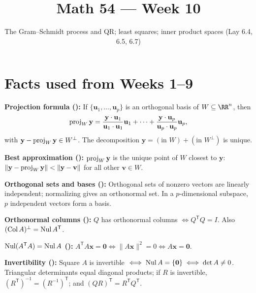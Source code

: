 \documentclass[10pt]{scrartcl}
\title{Math 54 --- Week 10}
\subtitle{The Gram--Schmidt process and QR; least squares; inner product spaces (Lay 6.4, 6.5, 6.7)}
\author{}\date{}\ihead{}
\newcommand{\vv}[1]{\mathbf{#1}}
\begin{document}
\maketitle

\section{Facts used from Weeks 1--9}

\begin{enumerate}[label=(W\arabic*),leftmargin=2.8em,itemsep=4pt]
  \ii {}\textbf{Projection formula ():} If $\{\vv u_1,\dots,\vv u_p\}$ is an orthogonal basis of $W\subseteq\RR^n$, then
  \[
    \proj_W\vv y = \frac{\vv y\cdot\vv u_1}{\vv u_1\cdot\vv u_1}\vv u_1 + \dots + \frac{\vv y\cdot\vv u_p}{\vv u_p\cdot\vv u_p}\vv u_p,
  \]
  with $\vv y-\proj_W\vv y\in W^\perp$. The decomposition $\vv y=(\text{in }W)+(\text{in }W^\perp)$ is unique.

  \ii {}\textbf{Best approximation ():} $\proj_W\vv y$ is the unique point of $W$ closest to $\vv y$: $\|\vv y-\proj_W\vv y\|<\|\vv y-\vv v\|$ for all other $\vv v\in W$.

  \ii {}\textbf{Orthogonal sets and bases ():} Orthogonal sets of nonzero vectors are linearly independent; normalizing gives an orthonormal set. In a $p$-dimensional subspace, $p$ independent vectors form a basis.

  \ii {}\textbf{Orthonormal columns ():} $Q$ has orthonormal columns $\iff Q^{\mathsf T}Q=I$. Also $(\operatorname{Col} A)^\perp = \operatorname{Nul} A^{\mathsf T}$.

  \ii {}\textbf{$\operatorname{Nul}(A^{\mathsf T}A)=\operatorname{Nul} A$ ():} $A^{\mathsf T}A\vv x=\vv 0 \iff \|A\vv x\|^2=0 \iff A\vv x=\vv 0$.

  \ii {}\textbf{Invertibility ():} Square $A$ is invertible $\iff \Nul A=\{\vv 0\} \iff \det A\ne 0$. Triangular determinants equal diagonal products; if $R$ is invertible, $(R^{\mathsf T})^{-1}=(R^{-1})^{\mathsf T}$; and $(QR)^{\mathsf T}=R^{\mathsf T}Q^{\mathsf T}$.


\end{enumerate}
\end{document}
